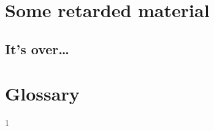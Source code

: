 \documentclass[mscthesis]{usiinfthesis}
\begin{document}
\chapter{Some retarded material}
\section{It's over\dots}

\backmatter

\chapter{Glossary} %

%
%



1
\end{document}
